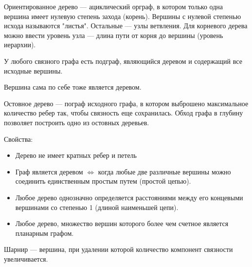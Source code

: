 Ориентированное дерево --- ациклический орграф, в котором только одна вершина имеет нулевую степень захода (корень).
Вершины с нулевой степенью исхода называются "листья". Остальные --- узлы ветвления. Для корневого дерева можно ввести уровень узла --- длина пути от корня до вершины (уровень иерархии).

У любого связного графа есть подграф, являющийся деревом и содержащий все исходные вершины.

Вершина сама по себе тоже является деревом.

Остовное дерево --- пограф исходного графа, в котором выброшено максимальное количество ребер так, чтобы связность еще сохранилась. Обход графа в глубину позволяет построить одно из остовных деревьев.

Свойства:
\begin{itemize}
	\item Дерево не имеет кратных ребер и петель
	\item Граф является деревом $\Leftrightarrow$ когда любые две различные вершины можно соединить  единственным простым путем (простой цепью).
	\item Любое дерево однозначно определяется расстояниями между его концевыми вершинами со степенью 1 (длиной наименьшей цепи).
	\item Любое дерево, множество вершин которого более чем счетное является планарным графом.
\end{itemize}

Шарнир --- вершина, при удалении которой количество компонент связности увеличивается.

